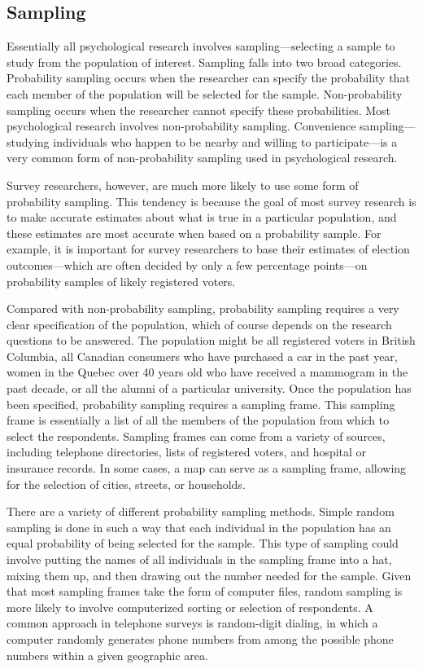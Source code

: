 \subsection{Sampling}

Essentially all psychological research involves sampling---selecting a sample to study from the population of interest. Sampling falls into two broad categories. Probability sampling occurs when the researcher can specify the probability that each member of the population will be selected for the sample. Non-probability sampling occurs when the researcher cannot specify these probabilities. Most psychological research involves non-probability sampling. Convenience sampling---studying individuals who happen to be nearby and willing to participate---is a very common form of non-probability sampling used in psychological research.

Survey researchers, however, are much more likely to use some form of probability sampling. This tendency is because the goal of most survey research is to make accurate estimates about what is true in a particular population, and these estimates are most accurate when based on a probability sample. For example, it is important for survey researchers to base their estimates of election outcomes---which are often decided by only a few percentage points---on probability samples of likely registered voters.

Compared with non-probability sampling, probability sampling requires a very clear specification of the population, which of course depends on the research questions to be answered. The population might be all registered voters in British Columbia, all Canadian consumers who have purchased a car in the past year, women in the Quebec over 40 years old who have received a mammogram in the past decade, or all the alumni of a particular university. Once the population has been specified, probability sampling requires a sampling frame. This sampling frame is essentially a list of all the members of the population from which to select the respondents. Sampling frames can come from a variety of sources, including telephone directories, lists of registered voters, and hospital or insurance records. In some cases, a map can serve as a sampling frame, allowing for the selection of cities, streets, or households.

There are a variety of different probability sampling methods. Simple random sampling is done in such a way that each individual in the population has an equal probability of being selected for the sample. This type of sampling could involve putting the names of all individuals in the sampling frame into a hat, mixing them up, and then drawing out the number needed for the sample. Given that most sampling frames take the form of computer
files, random sampling is more likely to involve computerized sorting or selection of respondents. A common approach in telephone surveys is random-digit dialing, in which a computer randomly generates phone numbers from among the possible phone numbers within a given geographic area.

